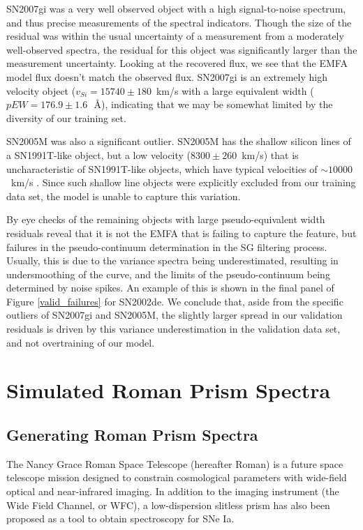 SN2007gi was a very well observed object with a high signal-to-noise spectrum, and thus precise measurements of the spectral indicators. Though the size of the residual was within the usual uncertainty of a measurement from a moderately well-observed spectra, the residual for this object was significantly larger than the measurement uncertainty. Looking at the recovered flux, we see that the EMFA model flux doesn't match the observed flux. SN2007gi is an extremely high velocity object ($v_{Si}=15740\pm180$~km/s with a large equivalent width ($pEW=176.9\pm1.6$~\,\AA{}), indicating that we may be somewhat limited by the diversity of our training set.

SN2005M was also a significant outlier. SN2005M has the shallow silicon lines of a SN1991T-like object, but a low velocity ($8300\pm 260$~km/s) that is uncharacteristic of SN1991T-like objects, which have typical velocities of $\sim 10000$~km/s \citep{blondin_spectroscopic_2012}. Since such shallow line objects were explicitly excluded from our training data set, the model is unable to capture this variation.

By eye checks of the remaining objects with large pseudo-equivalent width residuals reveal that it is not the EMFA that is failing to capture the feature, but failures in the pseudo-continuum determination in the SG filtering process. Usually, this is due to the variance spectra being underestimated, resulting in undersmoothing of the curve, and the limits of the pseudo-continuum being determined by noise spikes. An example of this is shown in the final panel of Figure \ref{valid_failures} for SN2002de. We conclude that, aside from the specific outliers of SN2007gi and SN2005M, the slightly larger spread in our validation residuals is driven by this variance underestimation in the validation data set, and not overtraining of our model.

\section{Simulated Roman Prism Spectra}
\label{wfirst}
\subsection{Generating Roman Prism Spectra}
The Nancy Grace Roman Space Telescope (hereafter Roman) is a future space telescope mission designed to constrain cosmological parameters with wide-field optical and near-infrared imaging. In addition to the imaging instrument (the Wide Field Channel, or WFC), a low-dispersion slitless prism has also been proposed as a tool to obtain spectroscopy for SNe Ia.

